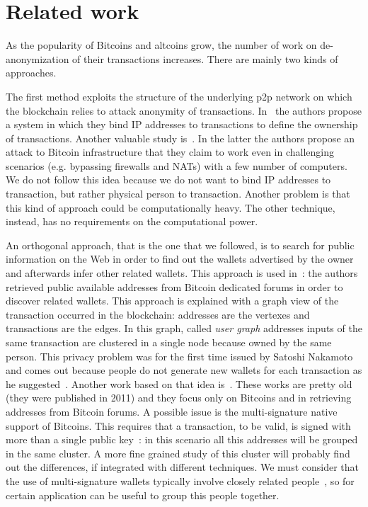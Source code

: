 \section{Related work} \label{relworks}
As the popularity of Bitcoins and altcoins grow, the number of work on
de-anonymization of their transactions increases.
There are mainly two kinds of approaches.

The first method exploits the structure of the underlying p2p network on which
the blockchain relies to attack anonymity of transactions.
In~\cite{bib:anonBitcoin} the authors propose a system in which they bind IP
addresses to transactions to define the ownership of transactions. Another
valuable study is~\cite{bib:deanonP2P}. In the latter the authors propose an attack
to Bitcoin infrastructure that they claim to work even in challenging scenarios
(e.g. bypassing firewalls and NATs) with a few number of computers. We do not
follow this idea because we do not want to bind IP addresses to transaction,
but rather physical person to transaction. Another problem is that this kind of
approach could be computationally heavy. The other technique, instead, has no
requirements on the computational power.

An orthogonal approach, that is the one that we followed, is to search for
public information on the Web in order to find out the wallets advertised
by the owner and afterwards infer other related wallets. This approach is used
in~\cite{bib:anonAnalysis}: the authors retrieved public available addresses from Bitcoin dedicated forums in order to discover related wallets. This approach is
explained with a graph view of the transaction occurred in the blockchain:
addresses are the vertexes and transactions are the edges. In this
graph, called \textit{user graph} addresses inputs of the same transaction are
clustered in a single node because owned by the same person. This privacy
problem was for the first time issued by Satoshi Nakamoto and comes out
because people do not generate new wallets for each transaction as he
suggested~\cite{bib:satoshi}. Another work based on that idea
is~\cite{bib:fistful}.
These works are pretty old (they were published in 2011) and they focus only on Bitcoins
and in retrieving addresses from Bitcoin forums. A possible issue is the
multi-signature native support of Bitcoins. This requires that a transaction,
to be valid, is signed with more than a single public
key~\cite{bib:multisignature}: in this scenario all this addresses will be
grouped in the same cluster. A more fine grained study of this cluster will
probably find out the differences, if integrated with different techniques. We
must consider that the use of multi-signature wallets typically involve closely related
people~\cite{bib:multisignaturebitcoinwiki}, so for certain application can be
useful to group this people together.

